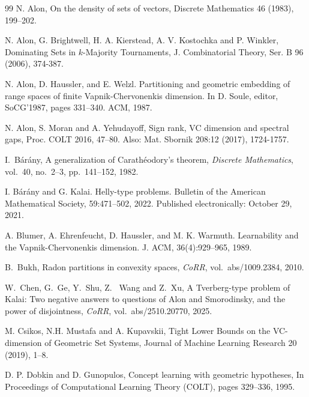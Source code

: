 \documentclass[11pt]{article}
\theoremstyle{plain}
\theoremstyle{definition}
\theoremstyle{remark}
\begin{document}
\begin{thebibliography}{99}
N. Alon,
On the density of sets of vectors,
Discrete Mathematics
46 (1983), 199--202.


N. Alon, G. Brightwell, H. A. Kierstead, A. V. Kostochka and
P. Winkler, Dominating Sets in $k$-Majority Tournaments,
J. Combinatorial Theory, Ser. B 96 (2006), 374-387.

N. Alon, D. Haussler, and E. Welzl. 
Partitioning and geometric embedding of range spaces of
finite Vapnik-Chervonenkis dimension. 
In D. Soule, editor, SoCG’1987, pages 331--340. ACM, 1987.

N. Alon, S. Moran and A. Yehudayoff,
Sign rank, VC dimension and spectral gaps,
Proc. COLT 2016, 47--80.
Also: Mat. Sbornik 208:12 (2017), 1724-1757.


I.~Bárány,
A generalization of Carath\'eodory's theorem,
\emph{Discrete Mathematics}, vol.~40, no.~2--3, pp.~141--152, 1982.

I. B\'ar\'any and G. Kalai. 
Helly-type problems. Bulletin of the American Mathematical
Society, 59:471–502, 2022. Published electronically: October 29, 2021.

A. Blumer, A. Ehrenfeucht, D. Haussler, and M. K. Warmuth. 
Learnability and the Vapnik-Chervonenkis dimension. 
J. ACM, 36(4):929–965, 1989.


B.~Bukh, Radon partitions in convexity spaces, \emph{CoRR}, vol.~abs/1009.2384, 2010. 

W.~Chen, G.~Ge, Y.~Shu, Z.~ Wang and Z.~Xu,
A Tverberg-type problem of Kalai: Two negative answers to questions of Alon and Smorodinsky, and the power of disjointness,
\emph{CoRR}, vol.~abs/2510.20770, 2025. 

M. Csikos, N.H. Mustafa and A. Kupavskii,
Tight Lower Bounds on the VC-dimension of Geometric
Set Systems,
Journal of Machine Learning Research 20 (2019), 1--8.

D. P. Dobkin and D. Gunopulos, 
Concept learning with geometric hypotheses,
In Proceedings of Computational Learning Theory (COLT), pages 329--336, 
1995.


\end{thebibliography}
\end{document}
